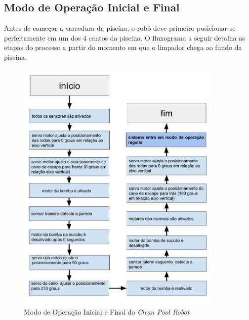 \subsection{Modo de Operação Inicial e Final}
Antes de começar a varredura da piscina, o robô deve primeiro posicionar-se
perfeitamente em um dos 4 cantos da piscina. O fluxograma a seguir detalha
as etapas do processo a partir do momento em que o limpador chega ao fundo
da piscina.
\par
\begin{figure}[h]
  \centering
  \includegraphics[width=0.9\textwidth]{figures/flow-initial-robot.jpg}
  \caption{Modo de Operação Inicial e Final do \textit{Clean Pool Robot}}
  \label{fig:schema-way-robot}
\end{figure}
\FloatBarrier


